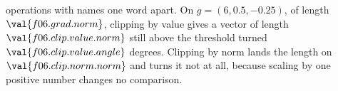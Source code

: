 \begin{summarybox}
{{{  operations with names one word apart.} On $g = (6, \num{0.5},
  -\num{0.25})$, of length $\val{f06.grad.norm}$, clipping by value gives a
  vector of length $\val{f06.clip.value.norm}$ \dash{} still above the
  threshold \dash{} turned $\val{f06.clip.value.angle}$ degrees. Clipping by
  norm lands the length on $\val{f06.clip.norm.norm}$ and turns it not at all,
  because scaling by one positive number changes no comparison}.}
\end{summarybox}

\canyou

